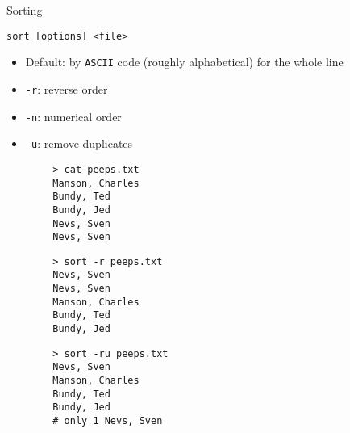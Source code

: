 \begin{frame}[fragile]{Sorting}
  \begin{block}{}
    \texttt{sort [options] <file>}
    \begin{itemize}
      \item Default: by \texttt{ASCII} code (roughly alphabetical) for the whole line
      \item \texttt{-r}: reverse order
      \item \texttt{-n}: numerical order
      \item \texttt{-u}: remove duplicates
    \end{itemize}
  \end{block}
  \vspace*{-2ex}
  \begin{minipage}[t]{\textwidth}
    \begin{minipage}[t]{.3\textwidth}
      \begin{verbatim}
        > cat peeps.txt
        Manson, Charles
        Bundy, Ted
        Bundy, Jed
        Nevs, Sven
        Nevs, Sven
      \end{verbatim}
    \end{minipage}
    \hfill
    \begin{minipage}[t]{.3\textwidth}
      \begin{verbatim}
        > sort -r peeps.txt
        Nevs, Sven
        Nevs, Sven
        Manson, Charles
        Bundy, Ted
        Bundy, Jed
      \end{verbatim}
    \end{minipage}
    \hfill
    \begin{minipage}[t]{.3\textwidth}
      \begin{verbatim}
        > sort -ru peeps.txt
        Nevs, Sven
        Manson, Charles
        Bundy, Ted
        Bundy, Jed
        # only 1 Nevs, Sven
      \end{verbatim}
    \end{minipage}
  \end{minipage}
\end{frame}

